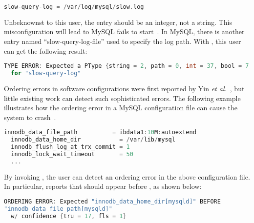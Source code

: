 \begin{lstlisting}[language=C, xleftmargin=.01\textwidth]
    slow-query-log = /var/log/mysql/slow.log
\end{lstlisting} 

Unbeknownst to this user, the entry  should be an 
integer, not a string. This misconfiguration will lead to 
MySQL fails to start~\cite{querylog}. In MySQL, there is another entry 
named ``slow-query-log-file'' used to specify the log path.
With \app, this user can get the following result:

\begin{lstlisting}[language=C, xleftmargin=.01\textwidth]
TYPE ERROR: Expected a PType {string = 2, path = 0, int = 37, bool = 7, size = 0} 
  for "slow-query-log"
\end{lstlisting} 

Ordering errors in software configurations were first reported by 
Yin {\em et al.}~\cite{yin11anempirical}, but little existing work
can detect such sophisticated errors. The following example
illustrates how the ordering error in a MySQL configuration file
can cause the system to crash~\cite{innod-ordering}. 

\begin{lstlisting}[language=C, xleftmargin=.01\textwidth]
  innodb_data_file_path          = ibdata1:10M:autoextend
  innodb_data_home_dir           = /var/lib/mysql
  innodb_flush_log_at_trx_commit = 1
  innodb_lock_wait_timeout       = 50
  ... 
\end{lstlisting}

By invoking \app, the user can detect an ordering error in the
above configuration file.
In particular, \app reports that  
should appear before , as shown
below:
 
\begin{lstlisting}[language=C, xleftmargin=.01\textwidth]
ORDERING ERROR: Expected "innodb_data_home_dir[mysqld]" BEFORE
"innodb_data_file_path[mysqld]" 
  w/ confidence {tru = 17, fls = 1}
\end{lstlisting} 



